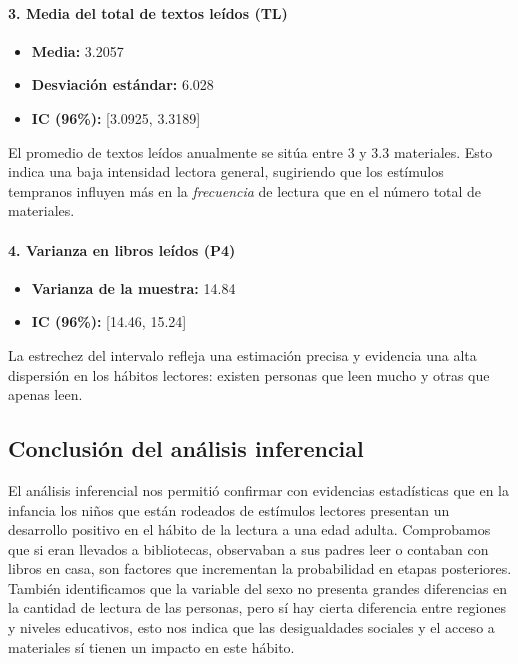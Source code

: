 \documentclass[aps,reprint]{revtex4-2}
\begin{document}
\paragraph{3. Media del total de textos leídos (TL)}
\begin{itemize}
    \item \textbf{Media:} 3.2057
    \item \textbf{Desviación estándar:} 6.028
    \item \textbf{IC (96\%):} [3.0925, 3.3189]
\end{itemize}
El promedio de textos leídos anualmente se sitúa entre 3 y 3.3 materiales. Esto indica una baja intensidad lectora general, sugiriendo que los estímulos tempranos influyen más en la \emph{frecuencia} de lectura que en el número total de materiales.

\paragraph{4. Varianza en libros leídos (P4)}
\begin{itemize}
    \item \textbf{Varianza de la muestra:} 14.84
    \item \textbf{IC (96\%):} [14.46, 15.24]
\end{itemize}
La estrechez del intervalo refleja una estimación precisa y evidencia una alta dispersión en los hábitos lectores: existen personas que leen mucho y otras que apenas leen.

\vspace{-0.8em}
\subsection{Conclusión del análisis inferencial}

El análisis inferencial nos permitió confirmar con evidencias estadísticas que en la infancia los niños que están rodeados de estímulos lectores presentan un desarrollo positivo en el hábito de la lectura a una edad adulta. Comprobamos que si eran llevados a bibliotecas, observaban a sus padres leer o contaban con libros en casa, son factores que incrementan la probabilidad en etapas posteriores. También identificamos que la variable del sexo no presenta grandes diferencias en la cantidad de lectura de las personas, pero sí hay cierta diferencia entre regiones y niveles educativos, esto nos indica que las desigualdades sociales y el acceso a materiales sí tienen un impacto en este hábito.
\end{document}
